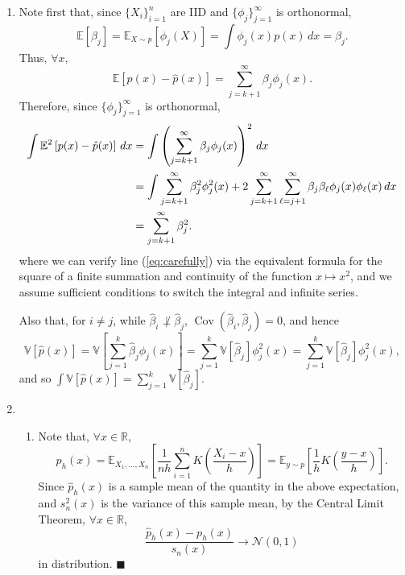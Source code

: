 \documentclass[11pt]{article}
\renewcommand{\qed}{\quad \ensuremath{\blacksquare}}
\newcommand{\E}{\mathbb{E}} %
\newcommand{\Var}{\mathbb{V}} %
\newcommand{\R}{\mathbb{R}} %
\begin{document}
\begin{enumerate}
\newpage
\item Note first that, since $\{X_i\}_{i = 1}^n$ are IID and
$\{\phi_j\}_{j = 1}^\infty$ is orthonormal,
\[\E \left[ \hat \beta_j \right]
    = \E_{X \sim p} \left[ \phi_j(X) \right]
    = \int \phi_j(x) p(x) \, dx
    = \beta_j.\]
Thus, $\forall x$,
\[\E[p(x) - \hat p(x)] = \sum_{j = k + 1}^\infty \beta_j \phi_j(x).\]
Therefore, since $\{\phi_j\}_{j = 1}^\infty$ is orthonormal,
\begin{align}
\notag
\int \E^2\left[ p(x) - \hat p(x) \right] \, dx
 &  = \int \left( \sum_{j = k + 1}^\infty \beta_j \phi_j(x) \right)^2 \, dx \\
\label{eq:carefully}
 &  = \int \sum_{j = k + 1}^\infty \beta_j^2 \phi_j^2(x)
                + 2\sum_{j = k + 1}^\infty \sum_{\ell = j + 1}^\infty
                        \beta_j\beta_\ell \phi_j(x)\phi_\ell(x) \, dx   \\
\notag
 &  = \sum_{j = k + 1}^\infty \beta_j^2.
\end{align}
where we can verify line (\ref{eq:carefully}) via the equivalent formula for
the square of a finite summation and continuity of the function
$x \mapsto x^2$, and we assume sufficient conditions to switch the integral and
infinite series.

Also that, for $i \neq j$, while $\hat\beta_i \not\perp \hat\beta_j$,
$\operatorname{Cov}(\hat\beta_i,\hat\beta_j) = 0$, and hence
\[\Var[\hat p(x)]
    = \Var \left[ \sum_{j = 1}^k \hat\beta_j \phi_j(x) \right]
    = \sum_{j = 1}^k \Var \left[ \hat\beta_j \right] \phi_j^2(x)
    = \sum_{j = 1}^k \Var \left[ \hat\beta_j \right] \phi_j^2(x),
\]
and so $\int \Var[\hat p(x)] = \sum_{j = 1}^k \Var \left[ \hat\beta_j \right]$.

\newpage
\item
\begin{enumerate}
\item Note that, $\forall x \in \R$,
\[p_h(x)
    = \E_{X_1,\dots,X_n} \left[ \frac{1}{nh} \sum_{i = 1}^n
                                    K\left( \frac{X_i - x}{h} \right) \right]
    = \E_{y \sim p} \left[ \frac{1}{h} K\left( \frac{y - x}{h} \right) \right].
\]
Since $\hat p_h(x)$ is a sample mean of the quantity in the above expectation,
and $s_n^2(x)$ is the variance of this sample mean, by the Central Limit
Theorem, $\forall x \in \R$,
\[\frac{\hat p_h(x) - p_h(x)}{s_n(x)} \to \mathcal{N}(0,1)\]
in distribution. \qed


\end{enumerate}
\end{enumerate}
\end{document}
